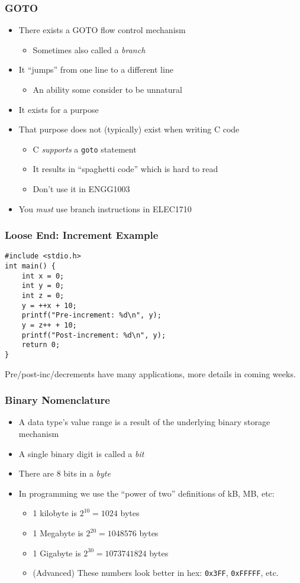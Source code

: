 \documentclass[14pt]{beamer}
\begin{document}
\begin{frame}
\frametitle{GOTO}
\begin{itemize}
\item There exists a GOTO flow control mechanism
	\begin{itemize}
		\item Sometimes also called a \textit{branch}
	\end{itemize}
\item It ``jumps'' from one line to a different line
	\begin{itemize}
		\item An ability some consider to be unnatural
	\end{itemize}
\item It exists for a purpose
\item That purpose does not (typically) exist when writing C code
	\begin{itemize}
		\item C \textit{supports} a \texttt{goto} statement
		\item It results in ``spaghetti code'' which is hard to read
		\item Don't use it in ENGG1003
	\end{itemize}
\item You \textit{must} use branch instructions in ELEC1710
\end{itemize}
\end{frame}

\begin{frame}[fragile]
\frametitle{Loose End: Increment Example}
\begin{lstlisting}[style=CStyle]
#include <stdio.h>
int main() {
	int x = 0;
	int y = 0;
	int z = 0;
	y = ++x + 10;
	printf("Pre-increment: %d\n", y);
	y = z++ + 10;
	printf("Post-increment: %d\n", y);
	return 0;
}
\end{lstlisting}
Pre/post-inc/decrements have many applications, more details in coming weeks.
\end{frame}

\begin{frame}
\frametitle{Binary Nomenclature}
\begin{itemize}
\item A data type's value range is a result of the underlying binary storage mechanism
\item A single binary digit is called a \textit{bit}
\item There are 8 bits in a \textit{byte}
\item In programming we use the ``power of two'' definitions of kB, MB, etc:
	\begin{itemize}
		\item 1 kilobyte is $2^{10} = 1024$ bytes
		\item 1 Megabyte is $2^{20} = 1048576$ bytes
		\item 1 Gigabyte is $2^{30} = 1073741824$ bytes
		\item (Advanced) These numbers look better in hex: \texttt{0x3FF}, \texttt{0xFFFFF}, etc.
	\end{itemize}
\end{itemize}
\end{frame}
\end{document}
